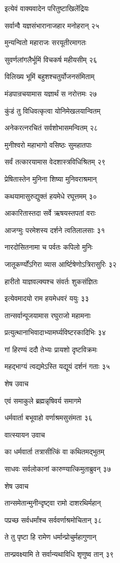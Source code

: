 इत्येवं वाक्यवादेन परितुष्टाखिलेंद्रियः

सर्वान्वै यज्ञसंभारानाजहार मनोहरान् २५

मुन्यन्वितो महाराजः सरयूतीरमागतः

सुवर्णलांगलैर्भूमिं विचकर्ष महीयसीम् २६

विलिख्य भूमिं बहुशश्चतुर्योजनसंमिताम्

मंडपान्रचयामास यज्ञार्थं स नरोत्तमः २७

कुंडं तु विधिवत्कृत्वा योनिमेखलयान्वितम्

अनेकरत्नरचितं सर्वशोभासमन्वितम् २८

मुनीश्वरो महाभागो वसिष्ठः सुमहातपाः

सर्वं तत्कारयामास वेदशास्त्रविधिश्रितम् २९

प्रेषितास्तेन मुनिना शिष्या मुनिवराश्रमान्

कथयामासुरुद्युक्तं हयमेधे रघूत्तमम् ३०

आकारितास्तदा सर्वे ऋषयस्तपतां वराः

आजग्मुः परमेशस्य दर्शने त्वतिलालसाः ३१

नारदोसितनामा च पर्वतः कपिलो मुनिः

जातूकर्ण्योंऽगिरा व्यास आर्ष्टिषेणोऽत्रिरासुरिः ३२

हारीतो याज्ञवल्क्यश्च संवर्तः शुकसंज्ञितः

इत्येवमादयो राम हयमेधवरं ययुः ३३

तान्सर्वान्पूजयामास रघुराजो महामनाः

प्रत्युत्थानाभिवादाभ्यामर्घ्यविष्टरकादिभिः ३४

गां हिरण्यं ददौ तेभ्यः प्रायशो दृष्टविक्रमः

महद्भाग्यं त्वद्यमेऽस्ति यद्यूयं दर्शनं गताः ३५

शेष उवाच

एवं समाकुले ब्रह्मन्नृषिवर्य समागमे

धर्मवार्ता बभूवाहो वर्णाश्रमसुसंमता ३६

वात्स्यायन उवाच

का धर्मवार्ता तत्रासीत्किं वा कथितमद्भुतम्

साधवः सर्वलोकानां कारुण्यात्किमुताब्रुवन् ३७

शेष उवाच

तान्समेतान्मुनीन्दृष्ट्वा रामो दाशरथिर्महान्

पप्रच्छ सर्वधर्मांश्च सर्ववर्णाश्रमोचितान् ३८

ते तु पृष्टा हि रामेण धर्मान्प्रोचुर्महागुणान्

तान्प्रवक्ष्यामि ते सर्वान्यथाविधि शृणुष्व तान् ३९


